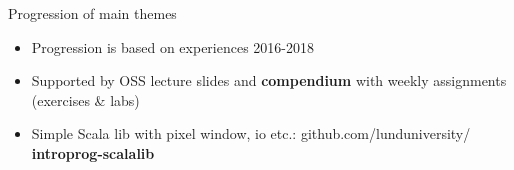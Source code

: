 \documentclass[aspectratio=169]{beamer}
\newenvironment{Slide}[1]%
  {\begin{frame}[environment=Slide]{#1}}
  {\end{frame}}%
\begin{document}
\begin{Slide}{Progression of main themes}
\begin{minipage}{0.54\textwidth}
  \end{minipage}%
    \begin{minipage}{0.32\textwidth}
      \begin{itemize}
        \item Progression is based on experiences 2016-2018 
        \item Supported by OSS lecture slides and \textbf{compendium} with weekly assignments (exercises \& labs)
        \item Simple Scala lib with pixel window, io etc.: {github.com/lunduniversity/\\\textbf{introprog-scalalib}}
      \end{itemize}
    \end{minipage}%
  \end{Slide}
\end{document}
